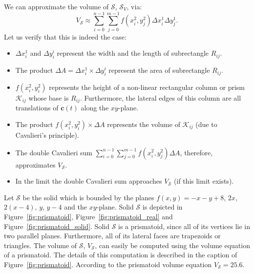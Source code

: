 \documentclass{article}
\theoremstyle{theorem}
\theoremstyle{definition}
\begin{document}
We can approximate the volume of $\mathcal{S}$, $\mathcal{S}_V$, via:
\begin{equation}
V_{\mathcal{S}} \approx \sum_{i=0}^{n-1} \sum_{j=0}^{m-1} f(x_i^2,y_j^2) \Delta x_i^1 \Delta y_j^1.
\end{equation}
Let us verify that this is indeed the case:
\begin{itemize}
\item $\Delta x_i^1$ and $\Delta y_i^i$ represent the width and the length of subrectangle $R_{ij}$.
\item The product $\Delta A = \Delta x_i^1\times \Delta y_i^i$ represent the area of subrectangle $R_{ij}$.
\item $f(x_i^2,y_i^2)$ represents the height of a non-linear rectangular column or prism $\mathcal{K}_{ij}$ whose base is $R_{ij}$. Furthermore, the lateral edges of this column are all translations 
of $\mathbf{c}(t)$ along the $xy$-plane. 
\item The product $f(x_i^2,y_i^2)\times \Delta A$ represents the volume of $\mathcal{K}_{ij}$ (due to Cavalieri's principle).
\item The double Cavalieri sum $\sum_{i=0}^{n-1} \sum_{j=0}^{m-1} f(x_i^2,y_j^2) \Delta A$, therefore, approximates $V_{\mathcal{S}}$. 
\item In the limit the double Cavalieri sum approaches $V_{\mathcal{S}}$ (if this limit exists). 
\end{itemize}



Let $\mathcal{S}$ be the solid which is bounded by the planes $f(x,y)=-x-y+8$, $2x$, $2(x-4)$, $y$, $y-4$ and the $xy$-plane. Solid $\mathcal{S}$ is depicted 
in Figure~\ref{fig:prismatoid}, Figure~\ref{fig:prismatoid_real} and Figure~\ref{fig:prismatoid_solid}. Solid $\mathcal{S}$ is a prismatoid, since all of its 
vertices lie in two parallel planes. Furthermore, all of its lateral faces are trapezoids or triangles. The volume of $\mathcal{S}$, $V_{\mathcal{S}}$, can easily be computed using the 
volume equation of a prismatoid. The details of this computation is described in the caption of Figure~\ref{fig:prismatoid}. According to the prismatoid volume 
equation $V_{\mathcal{S}}=25.6$.
\end{document}
